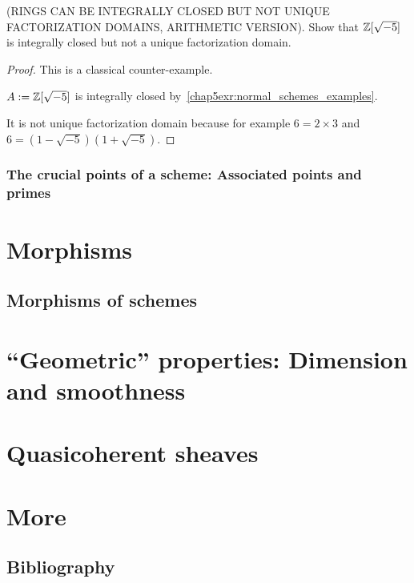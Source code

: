 \documentclass[11pt,fleqn]{book} %
\begin{document}
\begin{exr}
(RINGS CAN BE INTEGRALLY CLOSED BUT NOT UNIQUE FACTORIZATION DOMAINS, ARITHMETIC VERSION). Show that $\mathbb Z[\sqrt{-5}]$ is integrally closed but not a unique factorization domain.
\end{exr}
\begin{proof}
This is a classical counter-example.

 $A:=\mathbb Z[\sqrt{-5}]$ is integrally closed by~\ref{chap5exr:normal_schemes_examples}. 

 It is not unique factorization domain because for example $6=2\times 3$ and $6=(1-\sqrt{-5})(1+\sqrt{-5})$.
\end{proof}
\section{The crucial points of a scheme: Associated points and primes}

\part{Morphisms}
\chapter{Morphisms of schemes}
\part{``Geometric'' properties: Dimension and smoothness}

\part{Quasicoherent sheaves}

\part{More}


\chapter*{Bibliography}
\end{document}
